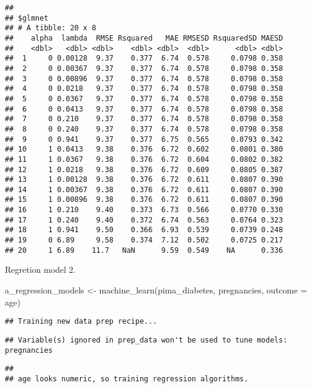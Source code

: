 \documentclass[
]{article}
\newenvironment{Shaded}{\begin{snugshade}}{\end{snugshade}}
\newcommand{\AttributeTok}[1]{\textcolor[rgb]{0.77,0.63,0.00}{#1}}
\newcommand{\FunctionTok}[1]{\textcolor[rgb]{0.00,0.00,0.00}{#1}}
\newcommand{\NormalTok}[1]{#1}
\newcommand{\OtherTok}[1]{\textcolor[rgb]{0.56,0.35,0.01}{#1}}
\begin{document}
\begin{verbatim}
## 
## $glmnet
## # A tibble: 20 x 8
##    alpha  lambda  RMSE Rsquared   MAE RMSESD RsquaredSD MAESD
##    <dbl>   <dbl> <dbl>    <dbl> <dbl>  <dbl>      <dbl> <dbl>
##  1     0 0.00128  9.37    0.377  6.74  0.578     0.0798 0.358
##  2     0 0.00367  9.37    0.377  6.74  0.578     0.0798 0.358
##  3     0 0.00896  9.37    0.377  6.74  0.578     0.0798 0.358
##  4     0 0.0218   9.37    0.377  6.74  0.578     0.0798 0.358
##  5     0 0.0367   9.37    0.377  6.74  0.578     0.0798 0.358
##  6     0 0.0413   9.37    0.377  6.74  0.578     0.0798 0.358
##  7     0 0.210    9.37    0.377  6.74  0.578     0.0798 0.358
##  8     0 0.240    9.37    0.377  6.74  0.578     0.0798 0.358
##  9     0 0.941    9.37    0.377  6.75  0.565     0.0793 0.342
## 10     1 0.0413   9.38    0.376  6.72  0.602     0.0801 0.380
## 11     1 0.0367   9.38    0.376  6.72  0.604     0.0802 0.382
## 12     1 0.0218   9.38    0.376  6.72  0.609     0.0805 0.387
## 13     1 0.00128  9.38    0.376  6.72  0.611     0.0807 0.390
## 14     1 0.00367  9.38    0.376  6.72  0.611     0.0807 0.390
## 15     1 0.00896  9.38    0.376  6.72  0.611     0.0807 0.390
## 16     1 0.210    9.40    0.373  6.73  0.566     0.0770 0.330
## 17     1 0.240    9.40    0.372  6.74  0.563     0.0764 0.323
## 18     1 0.941    9.50    0.366  6.93  0.539     0.0739 0.248
## 19     0 6.89     9.58    0.374  7.12  0.502     0.0725 0.217
## 20     1 6.89    11.7   NaN      9.59  0.549    NA      0.336
\end{verbatim}

Regretion model 2.

\begin{Shaded}
\begin{Highlighting}[]
\NormalTok{a\_regression\_models }\OtherTok{\textless{}{-}} \FunctionTok{machine\_learn}\NormalTok{(pima\_diabetes, pregnancies, }\AttributeTok{outcome =}\NormalTok{ age)}
\end{Highlighting}
\end{Shaded}

\begin{verbatim}
## Training new data prep recipe...
\end{verbatim}

\begin{verbatim}
## Variable(s) ignored in prep_data won't be used to tune models: pregnancies
\end{verbatim}

\begin{verbatim}
## 
## age looks numeric, so training regression algorithms.
\end{verbatim}
\end{document}
